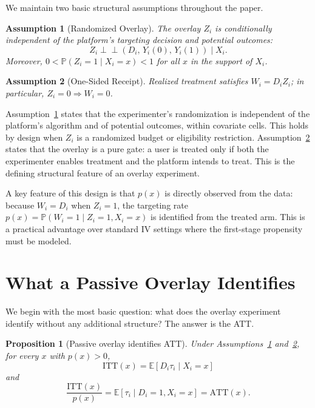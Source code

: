 \documentclass[12pt]{article}
\newtheorem{assumption}{Assumption}
\newtheorem{proposition}{Proposition}
\newcommand{\E}{\mathbb{E}}
\newcommand{\Prob}{\mathbb{P}}
\newcommand{\indep}{\perp\!\!\!\perp}
\newcommand{\ATT}{\mathrm{ATT}}
\newcommand{\ITT}{\mathrm{ITT}}
\begin{document}
We maintain two basic structural assumptions throughout the paper.

\begin{assumption}[Randomized Overlay]
\label{ass:overlay}
The overlay $Z_i$ is conditionally independent of the platform's targeting
decision and potential outcomes:
\[
  Z_i \indep (D_i,\, Y_i(0),\, Y_i(1)) \mid X_i.
\]
Moreover, $0 < \Prob(Z_i = 1 \mid X_i = x) < 1$ for all $x$ in the support
of $X_i$.
\end{assumption}

\begin{assumption}[One-Sided Receipt]
\label{ass:onesided}
Realized treatment satisfies $W_i = D_i Z_i$; in particular,
$Z_i = 0 \Rightarrow W_i = 0$.
\end{assumption}

Assumption~\ref{ass:overlay} states that the experimenter's randomization
is independent of the platform's algorithm and of potential outcomes, within
covariate cells. This holds by design when $Z_i$ is a randomized budget or
eligibility restriction. Assumption~\ref{ass:onesided} states that the
overlay is a pure gate: a user is treated only if both the experimenter
enables treatment and the platform intends to treat. This is the defining
structural feature of an overlay experiment.

A key feature of this design is that $p(x)$ is directly observed from the
data: because $W_i = D_i$ when $Z_i = 1$, the targeting rate $p(x) =
\Prob(W_i = 1 \mid Z_i = 1, X_i = x)$ is identified from the treated arm.
This is a practical advantage over standard IV settings where the first-stage
propensity must be modeled.

\section{What a Passive Overlay Identifies}
\label{sec:passive}

We begin with the most basic question: what does the overlay experiment
identify without any additional structure? The answer is the ATT.

\begin{proposition}[Passive overlay identifies ATT]
\label{prop:att}
Under Assumptions~\ref{ass:overlay} and~\ref{ass:onesided}, for every $x$
with $p(x) > 0$,
\begin{equation}
  \ITT(x) = \E[D_i \tau_i \mid X_i = x]
  \label{eq:itt}
\end{equation}
and
\begin{equation}
  \frac{\ITT(x)}{p(x)} = \E[\tau_i \mid D_i = 1, X_i = x] = \ATT(x).
  \label{eq:att}
\end{equation}
\end{proposition}
\end{document}
